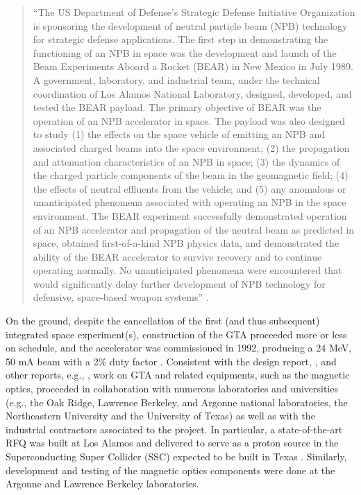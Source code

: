 \documentclass [12pt,a4paper,     ]{report} %
\begin{document}
\begin{quote}
``The US Department of Defense's Strategic Defense Initiative Organization is sponsoring the development of neutral particle beam (NPB) technology for strategic defense applications. The first step in demonstrating the functioning of an NPB in space was the development and launch of the Beam Experiments Aboard a Rocket (BEAR) in New Mexico in July 1989. A government, laboratory, and industrial team, under the technical coordination of Los Alamos National Laboratory, designed, developed, and tested the BEAR payload. The primary objective of BEAR was the operation of an NPB accelerator in space. The payload was also designed to study (1) the effects on the space vehicle of emitting an NPB and associated charged beams into the space environment; (2) the propagation and attenuation characteristics of an NPB in space; (3) the dynamics of the charged particle components of the beam in the geomagnetic field; (4) the effects of neutral effluents from the vehicle; and (5) any anomalous or unanticipated phenomena associated with operating an NPB in the space environment. The BEAR experiment successfully demonstrated operation of an NPB accelerator and propagation of the neutral beam as predicted in space, obtained first-of-a-kind NPB physics data, and demonstrated the ability of the BEAR accelerator to survive recovery and to continue operating normally. No unanticipated phenomena were encountered that would significantly delay further development of NPB technology for defensive, space-based weapon systems'' \cite{NUNZ1990-}.
\end{quote}


On the ground, despite the cancellation of the first (and thus subsequent) integrated space experiment(s), construction of the GTA proceeded more or less on schedule, and the accelerator was commissioned in 1992, producing a 24 MeV, 50 mA beam with a 2\% duty factor \cite{SAND1992-}.  Consistent with the design report, \cite{LAGTA1986-}, and other reports, e.g., \cite{BURIC1986-,LARHL1990-}, work on GTA and related equipments, such as the magnetic optics, proceeded in collaboration with numerous laboratories and universities (e.g., the Oak Ridge, Lawrence Berkeley, and Argonne national laboratories, the Northeastern University and the University of Texas) as well as with the industrial contractors associated to the project.  In particular, a state-of-the-art RFQ was built at Los Alamos and delivered to serve as a proton source in the Superconducting Super Collider (SSC) expected to be built in Texas \cite{LARHL1990-, MARSH1994-}.  Similarly, development and testing of the magnetic optics components were done at the Argonne and Lawrence Berkeley laboratories.
\end{document}
